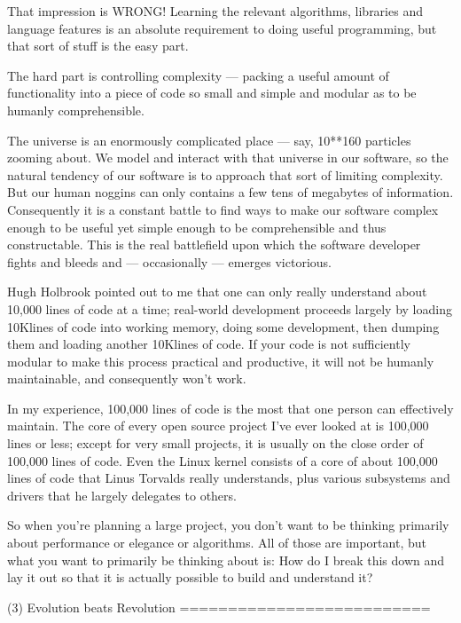     That impression is WRONG!  Learning the relevant algorithms, libraries and language 
    features is an absolute requirement to doing useful programming, but that sort of 
    stuff is the easy part.  

    The hard part is controlling complexity --- packing a useful amount of functionality 
    into a piece of code so small and simple and modular as to be humanly comprehensible. 

    The universe is an enormously complicated place  --- say, 10**160 particles zooming about. 
    We model and interact with that universe in our software, so the natural tendency 
    of our software is to approach that sort of limiting complexity.  But our human noggins 
    can only contains a few tens of megabytes of information.  Consequently it is a constant 
    battle to find ways to make our software complex enough to be useful yet simple enough 
    to be comprehensible and thus constructable.  This is the real battlefield upon which 
    the software developer fights and bleeds and  --- occasionally  --- emerges victorious. 

    Hugh Holbrook pointed out to me that one can only really understand about 10,000 lines 
    of code at a time;  real-world development proceeds largely by loading 10Klines of code 
    into working memory, doing some development, then dumping them and loading another 10Klines 
    of code.  If your code is not sufficiently modular to make this process practical and 
    productive, it will not be humanly maintainable, and consequently won't work.

    In my experience, 100,000 lines of code is the most that one person can effectively maintain.
    The core of every open source project I've ever looked at is 100,000 lines or less;  except 
    for very small projects, it is usually on the close order of 100,000 lines of code.  Even 
    the Linux kernel consists of a core of about 100,000 lines of code that Linus Torvalds really 
    understands, plus various subsystems and drivers that he largely delegates to others.

    So when you're planning a large project, you don't want to be thinking primarily about 
    performance or elegance or algorithms.  All of those are important, but what you want 
    to primarily be thinking about is:  How do I break this down and lay it out so that it 
    is actually possible to build and understand it?
    

(3) Evolution beats Revolution 
    ==========================

